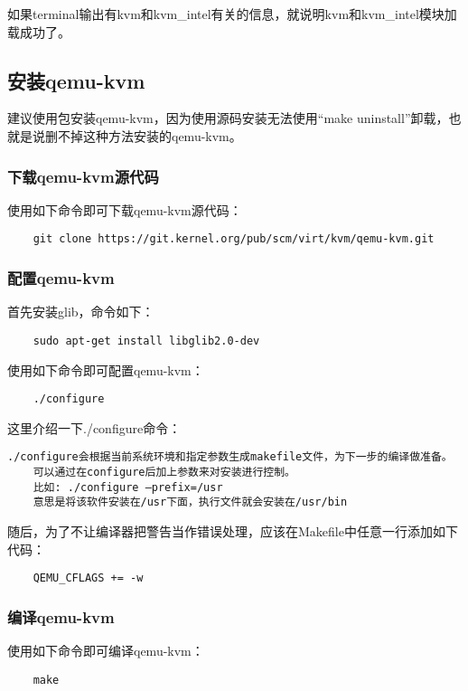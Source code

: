 \documentclass[a4paper,left=2.5cm,right=2.5cm,11pt]{article}
\begin{document}
	如果terminal输出有kvm和kvm\_intel有关的信息，就说明kvm和kvm\_intel模块加载成功了。

\subsection{安装qemu-kvm}
	建议使用包安装qemu-kvm，因为使用源码安装无法使用“make uninstall”卸载，也就是说删不掉这种方法安装的qemu-kvm。

\subsubsection{下载qemu-kvm源代码}
	使用如下命令即可下载qemu-kvm源代码：
	\begin{lstlisting}
	git clone https://git.kernel.org/pub/scm/virt/kvm/qemu-kvm.git
	\end{lstlisting}

\subsubsection{配置qemu-kvm}
	首先安装glib，命令如下：
	\begin{lstlisting}
	sudo apt-get install libglib2.0-dev
	\end{lstlisting}

	使用如下命令即可配置qemu-kvm：
	\begin{lstlisting}
	./configure
	\end{lstlisting}

	这里介绍一下./configure命令：
	\begin{lstlisting}[numberstyle = \color{white}]
	./configure会根据当前系统环境和指定参数生成makefile文件，为下一步的编译做准备。
	可以通过在configure后加上参数来对安装进行控制。
	比如: ./configure –prefix=/usr 
	意思是将该软件安装在/usr下面，执行文件就会安装在/usr/bin
	\end{lstlisting}

	随后，为了不让编译器把警告当作错误处理，应该在Makefile中任意一行添加如下代码：
	\begin{lstlisting}
	QEMU_CFLAGS += -w
	\end{lstlisting}

\subsubsection{编译qemu-kvm}
	使用如下命令即可编译qemu-kvm：
	\begin{lstlisting}
	make
	\end{lstlisting}
\end{document}

